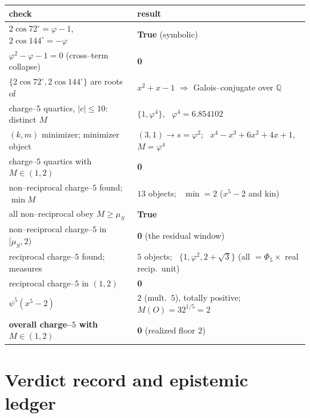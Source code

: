\documentclass[11pt]{article}
\newcommand{\Q}{\mathbb{Q}}
\newcommand{\Mah}{M}
\newcommand{\muS}{\mu_S}
\theoremstyle{plain}
\theoremstyle{definition}
\theoremstyle{remark}
\begin{document}
\begin{center}\small
\begin{tabular}{ll}
\toprule
check & result\\
\midrule
$2\cos72^\circ=\varphi-1$, \ $2\cos144^\circ=-\varphi$ & \textbf{True} (symbolic)\\
$\varphi^2-\varphi-1=0$ (cross--term collapse) & \textbf{0}\\
$\{2\cos72^\circ,2\cos144^\circ\}$ are roots of & $x^2+x-1$ $\Rightarrow$ Galois--conjugate over $\Q$\\
charge--$5$ quartics, $|c|\le10$: distinct $\Mah$ & $\{1,\varphi^4\}$, \ $\varphi^4=6.854102$\\
$(k,m)$ minimizer; minimizer object & $(3,1)\to s=\varphi^2$; \ $x^4-x^3+6x^2+4x+1$, $\Mah=\varphi^4$\\
charge--$5$ quartics with $\Mah\in(1,2)$ & \textbf{0}\\
non--reciprocal charge--$5$ found; $\min\Mah$ & $13$ objects; \ $\min=2$ ($x^5-2$ and kin)\\
all non--reciprocal obey $\Mah\ge\muS$ & \textbf{True}\\
non--reciprocal charge--$5$ in $[\muS,2)$ & \textbf{0} (the residual window)\\
reciprocal charge--$5$ found; measures & $5$ objects; \ $\{1,\varphi^2,2+\sqrt3\}$ (all $=\Phi_5\times$ real recip.\ unit)\\
reciprocal charge--$5$ in $(1,2)$ & \textbf{0}\\
$\psi^5(x^5-2)$ & $2$ (mult.\ $5$), totally positive; $\Mah(O)=32^{1/5}=2$\\
\textbf{overall charge--$5$ with $\Mah\in(1,2)$} & \textbf{0} \quad (realized floor $2$)\\
\bottomrule
\end{tabular}
\end{center}

\section{Verdict record and epistemic ledger}
\end{document}
